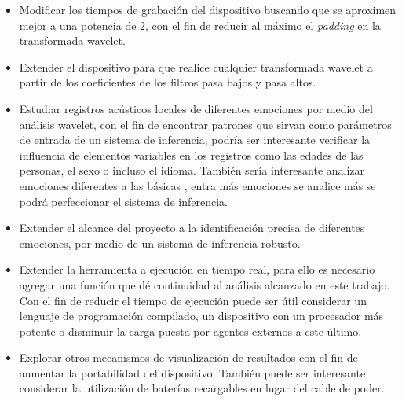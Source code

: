 \documentclass[11pt,lettersize]{article} %
\newcommand{\seccion}[1]{\hyperref[{#1}]{sección \ref*{#1}}}
\begin{document}
\begin{itemize}
	\item Modificar los tiempos de grabación del dispositivo buscando que se aproximen mejor a una potencia de 2, con el fin de reducir al máximo el \textit{padding} en la transformada wavelet.
	\item Extender el dispositivo para que realice cualquier transformada wavelet a partir de los coeficientes de los filtros pasa bajos y pasa altos.
	\item Estudiar registros acústicos locales de diferentes emociones por medio del análisis wavelet, con el fin de encontrar patrones que sirvan como parámetros de entrada de un sistema de inferencia, podría ser interesante verificar la influencia de elementos variables en los registros como las edades de las personas, el sexo o incluso el idioma. También sería interesante analizar emociones diferentes a las básicas \cite{Pell2011}, entra más emociones se analice más se podrá perfeccionar el sistema de inferencia.
	\item Extender el alcance del proyecto a la identificación precisa de diferentes emociones, por medio de un sistema de inferencia robusto.
	\item Extender la herramienta a ejecución en tiempo real, para ello es necesario agregar una función que dé continuidad al análisis alcanzado en este trabajo. Con el fin de reducir el tiempo de ejecución puede ser útil considerar un lenguaje de programación compilado, un dispositivo con un procesador más potente o disminuir la carga puesta por agentes externos a este último.
	\item Explorar otros mecanismos de visualización de resultados con el fin de aumentar la portabilidad del dispositivo. También puede ser interesante considerar la utilización de baterías recargables en lugar del cable de poder.
\end{itemize}



%
\end{document}
